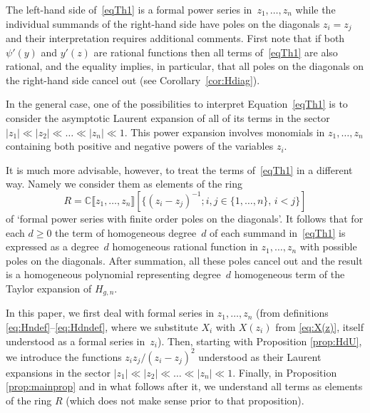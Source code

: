 \begin{remark}
The left-hand side of~\eqref{eqTh1} is a formal power series in~$z_1,\dots,z_n$ while the individual summands of the right-hand side have poles on the diagonals $z_i=z_j$ and their interpretation requires additional comments. First note that if both $\psi'(y)$ and $y'(z)$ are rational functions then all terms of~\eqref{eqTh1} are also rational, and the equality implies, in particular, that all poles on the diagonals on the right-hand side cancel out (see Corollary~\ref{cor:Hdiag}).

In the general case, one of the possibilities to interpret Equation~\eqref{eqTh1} is to consider the asymptotic Laurent expansion of all of its terms in the sector $|z_1|\ll |z_2|\ll\dots\ll |z_n|\ll 1$. This power expansion involves monomials in $z_1,\dots, z_n$ containing both positive and negative powers of the variables $z_i$.

It is much more advisable, however, to treat the terms of~\eqref{eqTh1} in a different way. Namely we consider them as elements of the ring
\[
R=\mathbb{C}\llbracket z_1,\dots,z_n\rrbracket [\{(z_i-z_j)^{-1}; i,j\in\{1,\ldots,n\},\,i<j\}]
\]
of `formal power series with finite order poles on the diagonals'. It follows that for each $d\ge0$ the term of homogeneous degree~$d$ of each summand in~\eqref{eqTh1} is expressed as a degree~$d$ homogeneous rational function in $z_1,\dots,z_n$ with possible poles on the diagonals. After summation, all these poles cancel out and the result is a homogeneous polynomial representing degree~$d$ homogeneous term of the Taylor expansion of $H_{g,n}$.

In this paper, we first deal with formal series in $z_1,\dots, z_n$ (from definitions \hbox{\eqref{eq:Hndef}--\eqref{eq:Hdndef}}, where we substitute $X_i$ with $X(z_i)$ from \eqref{eq:X(z)}, itself understood as a formal series in~$z_i$). Then, starting with Proposition \ref{prop:HdU}, we introduce the functions $z_iz_j/(z_i-z_j)^2$ understood as their Laurent expansions in the sector $|z_1|\ll |z_2|\ll\dots\ll |z_n|\ll 1$. Finally, in Proposition \ref{prop:mainprop} and in what follows after it, we understand all terms as elements of the ring $R$ (which does not make sense prior to that proposition).
\end{remark}


